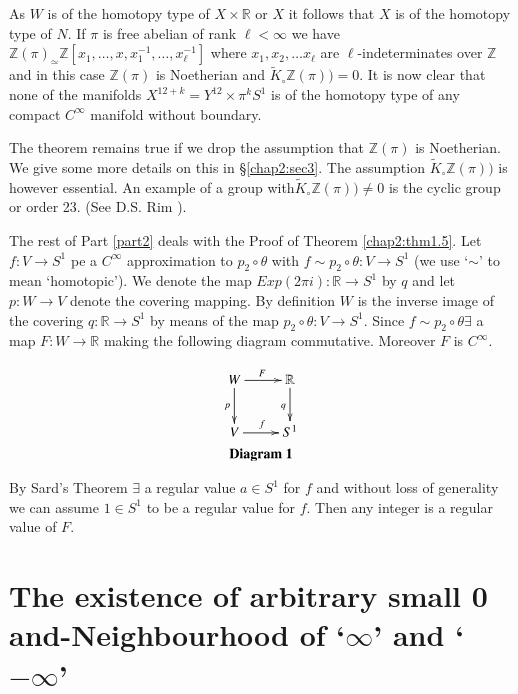 \begin{remark*}
As $W$ is of the homotopy type of $X\times \mathbb{R}$ or $X$ it
follows that $X$ is of the homotopy type of $N$. If $\pi$ is free
abelian of rank $\ell < \infty$ we have  $\mathbb{Z}(\pi)_\simeq
\mathbb{Z} [x_1, \ldots, x, x_1^{-1}, \ldots, x_\ell^{-1}]$ where $x_1,
x_2, \ldots x_\ell$ are $\ell$-indeterminates over  $\mathbb{Z}$ and in
this case  $\mathbb{Z} (\pi)$ is Noetherian and $\tilde{K}_\circ
\mathbb{Z} (\pi)) =0$. It is now clear that none of the manifolds
$X^{12+k} = Y^{12} \times \pi^{k} S^1$ is of the homotopy
type of any compact $C^\infty$ manifold without boundary. 
\end{remark*}

The theorem remains true if we drop the assumption that
$\mathbb{Z}(\pi)$ is Noetherian. We give some more details on this in 
\S \ref{chap2:sec3}. The assumption $\tilde{K}_\circ  \mathbb{Z}
(\pi))$ is however 
essential. An example of a group with\pageoriginale $\tilde{K}_\circ
\mathbb{Z} (\pi)) \neq 0$  is the cyclic group or order 23. (See
D.S. Rim \cite{c2:key9}).  

The rest of Part \ref{part2} deals with the Proof of Theorem
\ref{chap2:thm1.5}. Let $ f : V 
\to S^1$ pe a $C^\infty$ approximation to $p_2 \circ \theta$ with $f \sim
p_2  \circ \theta : V \to S^1$ (we use `$\sim$' to mean `homotopic'). We
denote the map $Exp ( 2 \pi i) : \mathbb{R} \to S^1$ by $q$ and let
$p : W \to V$ denote the covering mapping. By definition $W$ is the
inverse image of the covering $q:  \mathbb{R} \to S^1$ by means of
the map $p_2 \circ \theta : V \to S^1$. Since $f \sim p_{2} \circ \theta
\exists$ a map $F: W \to \mathbb{R}$ making the following diagram
commutative. Moreover $F$ is $C^\infty$. 
\begin{center}
\begin{gather*}
\xymatrix{
W \ar[r]^F \ar[d]_p & \mathbb{R} \ar[d]_{q} \\
V \ar[r]^f & S^1
} \\
\centerline{\bf Diagram 1}
\end{gather*}
\end{center}


By Sard's Theorem $\exists$ a regular value $a \in S^1$ for
$f$ and without loss of generality we can assume $1 \in S^1$
to be a regular value for $f$. Then any integer is a regular value of
$F$. 

\section[The existence of arbitrary small...]{The existence of arbitrary small 0 and\hfil{}-Neighbourhood of
  `$\infty$' and `$-\infty$'}\label{chap2:sec2} %

